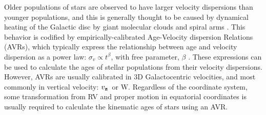 \documentclass[]{aastex631}
\newcommand{\eg}{{\it e.g.}}
\newcommand{\vz}{$v_{\bf z}$}
\begin{document}
Older populations of stars are observed to have larger velocity dispersions
than younger populations, and this is generally thought to be caused by
dynamical heating of the Galactic disc by giant molecular clouds and spiral
arms \citep[\eg][]{stromberg1946, wielen1977, nordstrom2004, holmberg2007,
holmberg2009, aumer2009, casagrande2011, yu2018, ting2019}.
This behavior is codified by empirically-calibrated Age-Velocity dispersion
Relations (AVRs), which typically express the relationship between age and
velocity dispersion as a power law: $\sigma_v \propto t^\beta$, with free
parameter, $\beta$ \citep[\eg][]{holmberg2009, yu2018, mackereth2019}.
These expressions can be used to calculate the ages of stellar populations
from their velocity dispersions.
However, AVRs are usually calibrated in 3D Galactocentric velocities, and most
commonly in vertical velocity: \vz\ or W.
Regardless of the coordinate system, some transformation from RV and proper
motion in equatorial coordinates is usually required to calculate the
kinematic ages of stars using an AVR.
\end{document}
